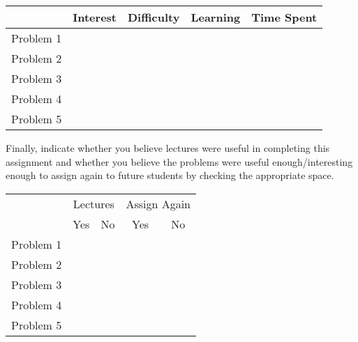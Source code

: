 \documentclass[11pt,letterpaper]{article}
\begin{document}
\vspace{0.25cm}
\begin{center}
\begin{tabular}{c||c|c|c|c|}
 & Interest & Difficulty & Learning & Time Spent \\ \hline \hline
Problem 1 &  &  &  &  \\ \hline
Problem 2 &  &  &  &  \\ \hline
Problem 3 &  &  &  &  \\ \hline
Problem 4 &  &  &  &  \\ \hline
Problem 5 &  &  &  &  \\ \hline
\end{tabular}
\end{center}
\vspace{0.25cm}

Finally, indicate whether you believe lectures were useful in completing this assignment and whether you believe the problems were useful enough/interesting enough to assign again to future students by checking the appropriate space.

\vspace{0.25cm}
\begin{center}
\begin{tabular}{c||c|c|c|c|}
  & \multicolumn{2}{c|}{Lectures} &  \multicolumn{2}{c|}{Assign Again} \\ \cline{2-5}
   & Yes & No & Yes & No \\ \hline \hline
  Problem 1 &  &  &  &  \\ \hline 
  Problem 2 &  &  &  &  \\ \hline 
  Problem 3 &  &  &  &  \\ \hline 
  Problem 4 &  &  &  &  \\ \hline 
  Problem 5 &  &  &  &  \\ \hline 
\end{tabular}
\end{center}
\end{document}
